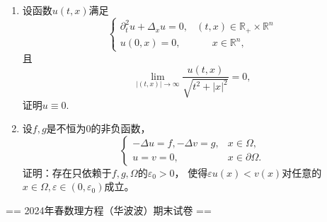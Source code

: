\begin{enumerate}
    \item 设函数$u(t,x)$满足
    $$\begin{cases}
        \partial_t^2u+\Delta_xu=0,&(t,x)\in\mathbb{R}_+\times\mathbb{R}^n\\
        u(0,x)=0,&\quad\;\,\,x\in\mathbb{R}^n,
    \end{cases}$$
    且
    $$\lim_{|(t,x)|\to\infty} \frac{u(t,x)}{\sqrt{t^2+|x|^2}}=0,$$
    证明$u\equiv0$.
    \item 设$f,g$是不恒为$0$的非负函数，
    \[\begin{cases}-\Delta u=f,-\Delta v=g,&x\in\Omega,\\
        u=v=0,&x\in\partial\Omega.
    \end{cases}\]
    证明：存在只依赖于$f,g,\Omega$的$\varepsilon_0>0$，
    使得$\varepsilon u(x)<v(x)$对任意的$x\in\Omega,\varepsilon\in(0,\varepsilon_0)$成立。
\end{enumerate}

== 2024年春数理方程（华波波）期末试卷 ==

